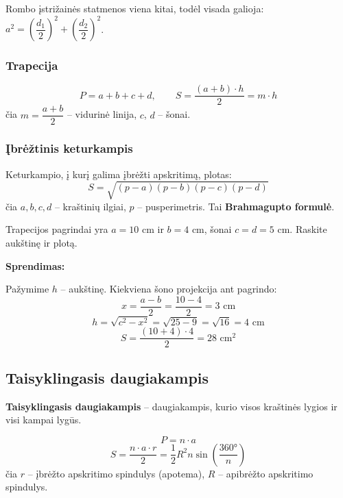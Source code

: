\begin{remark}
Rombo įstrižainės statmenos viena kitai, todėl visada galioja: $a^2 = \left(\dfrac{d_1}{2}\right)^2 + \left(\dfrac{d_2}{2}\right)^2$.
\end{remark}

\subsubsection*{Trapecija}

\begin{tcolorbox}[title={Trapecija (pagrindai $a$, $b$; aukštinė $h$; vidurinė linija $m$)}]
\[
P = a + b + c + d, \qquad S = \frac{(a+b) \cdot h}{2} = m \cdot h
\]
čia $m = \dfrac{a+b}{2}$ – vidurinė linija, $c$, $d$ – šonai.
\end{tcolorbox}

\subsubsection*{Įbrėžtinis keturkampis}

Keturkampio, į kurį galima įbrėžti apskritimą, plotas:
\[
S = \sqrt{(p-a)(p-b)(p-c)(p-d)}
\]
čia $a, b, c, d$ – kraštinių ilgiai, $p$ – pusperimetris. Tai \textbf{Brahmagupto formulė}.

\begin{example}
Trapecijos pagrindai yra $a = 10$ cm ir $b = 4$ cm, šonai $c = d = 5$ cm. Raskite aukštinę ir plotą.

\textbf{Sprendimas:}

Pažymime $h$ – aukštinę. Kiekviena šono projekcija ant pagrindo:
\[
x = \frac{a - b}{2} = \frac{10 - 4}{2} = 3 \text{ cm}
\]
\[
h = \sqrt{c^2 - x^2} = \sqrt{25 - 9} = \sqrt{16} = 4 \text{ cm}
\]
\[
S = \frac{(10+4) \cdot 4}{2} = 28 \text{ cm}^2
\]
\end{example}

\subsection{Taisyklingasis daugiakampis}

\begin{definition}
\textbf{Taisyklingasis daugiakampis} – daugiakampis, kurio visos kraštinės lygios ir visi kampai lygūs.
\end{definition}

\begin{tcolorbox}[title={Taisyklingasis $n$-kampis (kraštinė $a$)}]
\[
P = n \cdot a
\]
\[
S = \frac{n \cdot a \cdot r}{2} = \frac{1}{2} R^2 n \sin\!\left(\frac{360°}{n}\right)
\]
čia $r$ – įbrėžto apskritimo spindulys (apotema), $R$ – apibrėžto apskritimo spindulys.
\end{tcolorbox}

